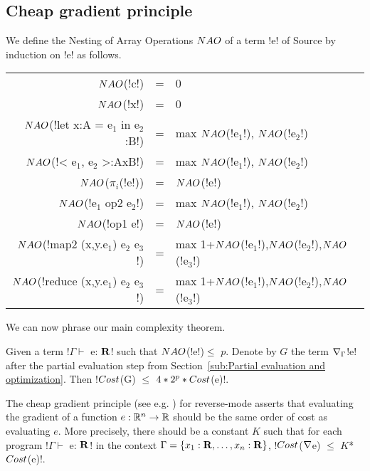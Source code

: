 

\subsection{Cheap gradient principle}

We define the Nesting of Array Operations $NAO$ of a term !e! of Source by induction on !e! as follows.

\begin{tabular}{r c l}
    $NAO$(!c!) &=& 0 \\
    $NAO$(!x!) &=& 0 \\
    $NAO$(!let x:A = e$_1$ in e$_2$:B!) &=& max $NAO$(!e$_1$!), $NAO$(!e$_2$!)  \\ 
    $NAO$(!< e$_1$, e$_2$ >:AxB!) &=& max $NAO$(!e$_1$!), $NAO$(!e$_2$!) \\ 
    $NAO$($\pi_i$(!e!)) &=& $NAO$(!e!)\\
    $NAO$(!e$_1$ op2 e$_2$!) &=& max $NAO$(!e$_1$!), $NAO$(!e$_2$!)\\
    $NAO$(!op1 e!) &=& $NAO$(!e!) \\
    $NAO$(!map2 (x,y.e$_1$) e$_2$ e$_3$!) &=& max 1+$NAO$(!e$_1$!),$NAO$(!e$_2$!),$NAO$(!e$_3$!) \\
    $NAO$(!reduce (x,y.e$_1$) e$_2$ e$_3$!) &=& max 1+$NAO$(!e$_1$!),$NAO$(!e$_2$!),$NAO$(!e$_3$!) \\
\end{tabular}

We can now phrase our main complexity theorem.

\begin{theorem}
    \label{thm:complexity}
    Given a term !$\Gamma \vdash$ e: $\mathbf{R}$! such that $NAO$(!e!)$\leq$ $p$.
    Denote by $G$ the term $\nabla_\Gamma$!e! after the partial evaluation step from Section~\ref{sub:Partial evaluation and optimization}.
    Then !$Cost$(G) $\leq$ $4*2^{p}*Cost$(e)!.
\end{theorem}

The cheap gradient principle (see e.g. \cite{griewank2008evaluating}) for reverse-mode
asserts that evaluating the gradient of a function $e:\mathbb{R}^n\to\mathbb{R}$ 
should be the same order of cost as evaluating $e$. 
More precisely, there should be a constant $K$ such that for each program !$\Gamma \vdash$ e: $\mathbf{R}$! in the context $\Gamma=\{x_1:\mathbf{R},\ldots,x_n:\mathbf{R}\}$,
!$Cost$($\nabla$e) $\leq$ $K$*$Cost$(e)!.

